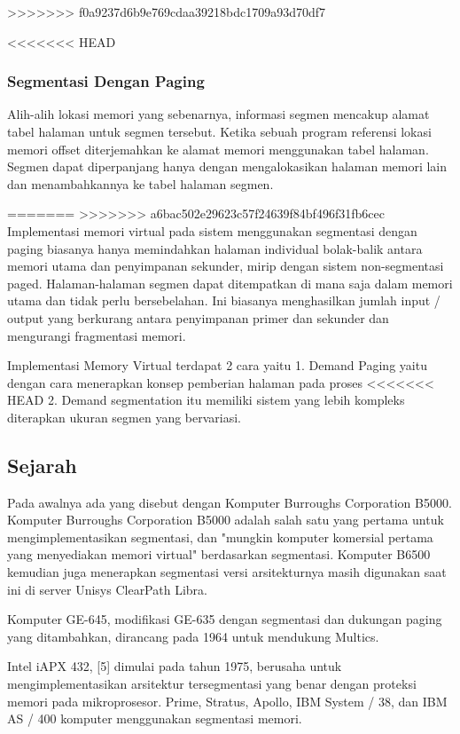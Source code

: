 >>>>>>> f0a9237d6b9e769cdaa39218bdc1709a93d70df7

<<<<<<< HEAD
\subsubsection{Segmentasi Dengan Paging}
Alih-alih lokasi memori yang sebenarnya, informasi segmen mencakup alamat tabel halaman untuk segmen tersebut. Ketika sebuah program referensi lokasi memori offset diterjemahkan ke alamat memori menggunakan tabel halaman. Segmen dapat diperpanjang hanya dengan mengalokasikan halaman memori lain dan menambahkannya ke tabel halaman segmen.

=======
>>>>>>> a6bac502e29623c57f24639f84bf496f31fb6cec
Implementasi memori virtual pada sistem menggunakan segmentasi dengan paging biasanya hanya memindahkan halaman individual bolak-balik antara memori utama dan penyimpanan sekunder, mirip dengan sistem non-segmentasi paged. Halaman-halaman segmen dapat ditempatkan di mana saja dalam memori utama dan tidak perlu bersebelahan. Ini biasanya menghasilkan jumlah input / output yang berkurang antara penyimpanan primer dan sekunder dan mengurangi fragmentasi memori.

Implementasi Memory Virtual terdapat 2 cara yaitu 
	1. Demand Paging yaitu dengan cara menerapkan konsep pemberian halaman pada proses
<<<<<<< HEAD
	2. Demand segmentation itu memiliki sistem yang lebih kompleks diterapkan ukuran segmen yang bervariasi.
\subsection{Sejarah}
Pada awalnya ada yang disebut dengan Komputer Burroughs Corporation B5000. Komputer Burroughs Corporation B5000 adalah salah satu yang pertama untuk mengimplementasikan segmentasi, dan "mungkin komputer komersial pertama yang menyediakan memori virtual" berdasarkan segmentasi. Komputer B6500 kemudian juga menerapkan segmentasi versi arsitekturnya masih digunakan saat ini di server Unisys ClearPath Libra.

Komputer GE-645, modifikasi GE-635 dengan segmentasi dan dukungan paging yang ditambahkan, dirancang pada 1964 untuk mendukung Multics.

Intel iAPX 432, [5] dimulai pada tahun 1975, berusaha untuk mengimplementasikan arsitektur tersegmentasi yang benar dengan proteksi memori pada mikroprosesor.
Prime, Stratus, Apollo, IBM System / 38, dan IBM AS / 400 komputer menggunakan segmentasi memori.

